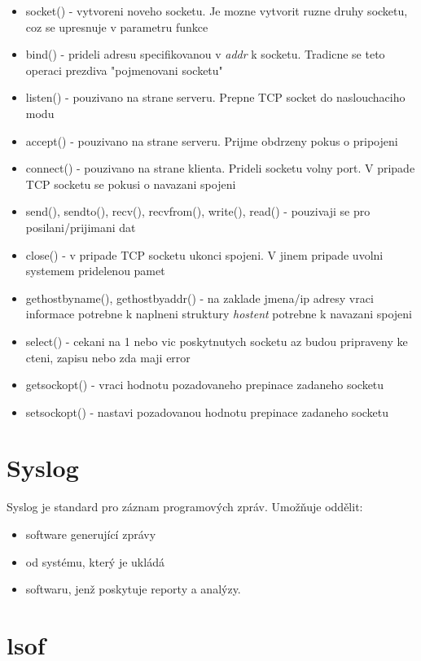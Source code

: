 \documentclass[a4paper]{article}
\begin{document}
	\begin{itemize}
	\item socket() - vytvoreni noveho socketu. Je mozne vytvorit ruzne druhy socketu, coz se upresnuje v parametru funkce
	\item bind() - prideli adresu specifikovanou v \emph{addr} k socketu. Tradicne se teto operaci prezdiva "pojmenovani socketu"
	\item listen() - pouzivano na strane serveru. Prepne TCP socket do naslouchaciho modu
	\item accept() - pouzivano na strane serveru. Prijme obdrzeny pokus o pripojeni
	\item connect() - pouzivano na strane klienta. Prideli socketu volny port. V pripade TCP socketu se pokusi o navazani spojeni
	\item send(), sendto(), recv(), recvfrom(), write(), read() - pouzivaji se pro posilani/prijimani dat
	\item close() - v pripade TCP socketu ukonci spojeni. V jinem pripade uvolni systemem pridelenou pamet
	\item gethostbyname(), gethostbyaddr() - na zaklade jmena/ip adresy vraci informace potrebne k naplneni struktury \emph{hostent} potrebne k navazani spojeni
	\item select() - cekani na 1 nebo vic poskytnutych socketu az budou pripraveny ke cteni, zapisu nebo zda maji error
	\item getsockopt() - vraci hodnotu pozadovaneho prepinace zadaneho socketu
	\item setsockopt() - nastavi pozadovanou hodnotu prepinace zadaneho socketu
	\end{itemize}

	\section{Syslog}

	Syslog je standard pro záznam programových zpráv. Umožňuje oddělit:
	\begin{itemize}
	\item software generující zprávy
	\item od systému, který je ukládá
	\item softwaru, jenž poskytuje reporty a analýzy.
	\end{itemize}

	\section{lsof}
\end{document}
